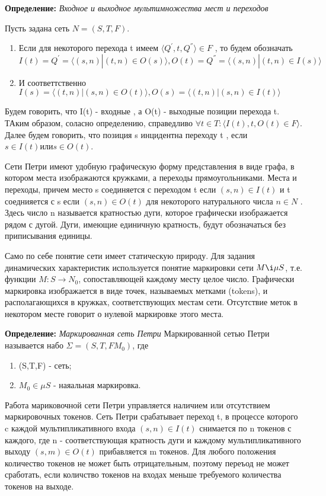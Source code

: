 \documentclass[a4paper,14pt]{article}
\begin{document}
\textbf{Определение:}  \textit{Входное и выходное мультимножества мест и переходов}
\par Пусть задана сеть $N = (S,T,F)$.
\begin{enumerate}
\item Если для некоторого перехода t имеем $\langle Q^{'}, t, Q^{''} \rangle \in F$ , то будем обозначать $I(t) = Q^{'} = \langle (s,n)|(t,n) \in O(s) \rangle , O(t) = Q^{''} = \langle(s,n) | (t ,n) \in I(s) \rangle$
\item  И соответтственно $I(s) = \langle (t,n)|(s,n) \in O(t) \rangle , O(s) = \langle(t,n) | (s ,n) \in I(t) \rangle$
\end{enumerate}
Будем говорить, что I(t) - входные , а O(t) - выходные позиции перехода t. ТАким образом, соласно определению, справедливо $\forall t \in T : \langle I(t), t, O(t) \in F \rangle$. Далее будем говорить, что позиция s инцидентна переходу t , если $s \in I(t) или s \in O(t)$.

Сети Петри имеют удобную графическую форму представления в виде графа, в котором места изображаются кружками, а переходы прямоугольниками. Места и переходы, причем место s соединяется с переходом t если $(s,n) \in I(t)$ и t соеднияется с s если $(s,n) \in O(t)$  для некоторого натурального числа $n \in N$ . Здесь число n называется кратностью дуги, которое графически изображается рядом с дугой. Дуги, имеющие единичную кратность, будут обозначаться без приписывания единицы.

Само по себе понятие сети имеет статическую природу. Для задания динамических характеристик используется понятие маркировки сети $M \i \mu S$, т.е. функции $M : S \longrightarrow N_{0}$, сопоставляющей каждому месту целое число. Графически маркировка изображается в виде точек, называемых метками (tokens), и располагающихся в кружках, соответствующих местам сети. Отсутствие меток в некотором месте говорит о нулевой маркировке этого места.

\textbf{Определение:}  \textit{Маркированная сеть Петри}
Маркированной сетью Петри называется набо $\Sigma = (S,T,F M_{0})$, где
\begin{enumerate}
\item (S,T,F) - сеть;
\item $M_{0} \in  \mu S$ - наяальная маркировка.
\end{enumerate}

Работа мариковочной сети Петри управляется наличием или отсутствием маркировочных токенов. Сеть Петри срабатывает  переход t, в процессе которого c каждой  мультипликативного входа $(s, n) \in I(t)$ снимается по n токенов с каждого, где n - соответствующая кратность дуги и каждому мультипликативного выходу $(s, m) \in O(t)$ прибавляется m токенов.
Для любого положения количество токенов не может быть отрицательным, поэтому переъод не может сработать, если количство токенов на входах меньше требуемого количества токенов на выходе. 
\end{document}

